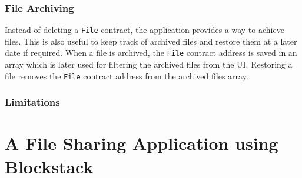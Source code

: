 			\subsubsection{File Archiving}
				Instead of deleting a \texttt{File} contract, the application provides a way to achieve files. This is also useful to keep track of archived files and restore them at a later date if required. When a file is archived, the \texttt{File} contract address is saved in an array which is later used for filtering the archived files from the UI. Restoring a file removes the \texttt{File} contract address from the archived files array.
				
			\subsubsection{Limitations}
			
	\section{A File Sharing Application using Blockstack}